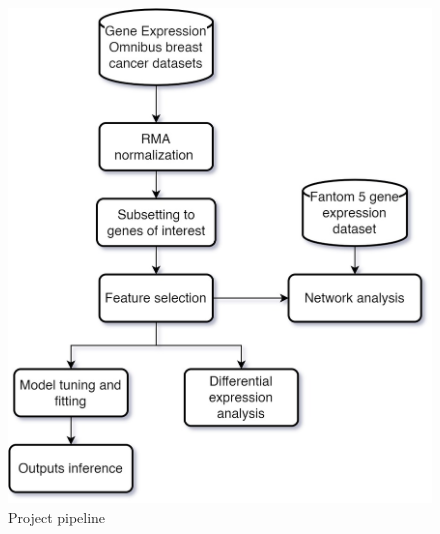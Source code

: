 \documentclass[journal]{IEEEtran}
\begin{document}
\begin{figure}[H]
    \centering
    \includegraphics[width=\linewidth]{images/flowchart.jpg}
    \caption{Project pipeline}\label{fig:pipeline}
\end{figure}
\end{document}
